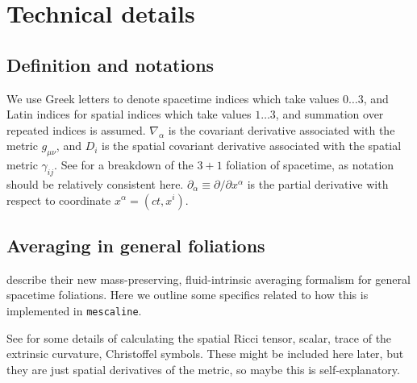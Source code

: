 \documentclass[a4paper]{article}
\newcommand{\alp}{\alpha}
\newcommand{\gam}{\gamma}
\newcommand{\pd}{\partial}
\begin{document}
\section{Technical details}


\subsection{Definition and notations}

We use Greek letters to denote spacetime indices which take values $0\ldots 3$, and Latin indices for spatial indices which take values $1\ldots 3$, and summation over repeated indices is assumed. $\nabla_\alp$ is the covariant derivative associated with the metric $g_{\mu\nu}$, and $D_i$ is the spatial covariant derivative associated with the spatial metric $\gam_{ij}$. See \citet{Macpherson:2019tv} for a breakdown of the $3+1$ foliation of spacetime, as notation should be relatively consistent here. $\pd_\alp \equiv \pd / \pd x^\alp $ is the partial derivative with respect to coordinate $x^\alp=(ct,x^i)$.


\subsection{Averaging in general foliations}


\citet{buchert2018b,Buchert2020} describe their new mass-preserving, fluid-intrinsic averaging formalism for general spacetime foliations. Here we outline some specifics related to how this is implemented in \texttt{mescaline}.



See \citet{Macpherson:2019tv} for some details of calculating the spatial Ricci tensor, scalar, trace of the extrinsic curvature, Christoffel symbols. These might be included here later, but they are just spatial derivatives of the metric, so maybe this is self-explanatory. 
\end{document}
